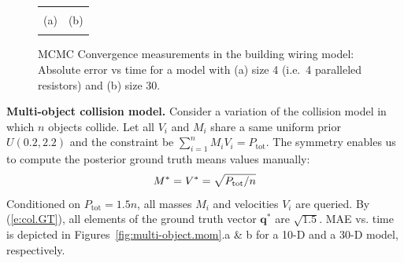 \documentclass{article} %
\newcommand{\bvec}[1]{\textbf{#1}}
\begin{document}
\begin{figure}[t!]
\begin{center}
\begin{tabular}{cc}
\vspace{-1.5mm}
\\
\hspace{-5mm} \footnotesize(a) 
& \hspace{-4mm} \footnotesize(b) 
\\
\multicolumn{2}{c}{}
\end{tabular}
\end{center}
\vspace{-6mm}
\caption{\footnotesize 
MCMC Convergence measurements in the building wiring model: 
Absolute error vs time for a model with (a) size 4 (i.e.\ 4 paralleled resistors) and (b) size 30.}
\label{fig:resistor}
\vspace{-2mm}
\end{figure}


{\bf Multi-object collision model.}
Consider a variation of the collision model in which $n$ objects collide.  
Let all $V_i$ and $M_i$ share a same uniform prior $U(0.2, 2.2)$ and the constraint be $\sum_{i=1}^n{M_i V_i} = P_{\text{tot}}$. 
The symmetry enables us to compute the posterior ground truth means  values  manually:
\begin{equation}\footnotesize
\label{e:col.GT}
M^* = V^* = \sqrt{P_{\text{tot}} / n} %
\end{equation}
Conditioned on $P_{\text{tot}} = 1.5 n$, all masses $M_i$ and velocities  $V_i$ are queried. 
By (\ref{e:col.GT}), all elements of the ground truth vector $\bvec{q}^*$ are $\sqrt{1.5}$.
%
MAE vs. time is depicted in Figures~\ref{fig:multi-object.mom}.a \& b for a 10-D and a 30-D model, respectively.
\end{document}

